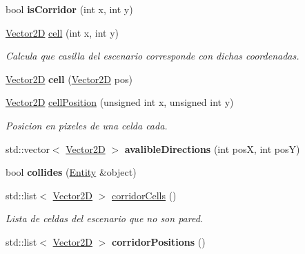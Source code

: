 \begin{DoxyCompactItemize}
\item 
\hypertarget{class_scenario_ac55d32b9280231f5f3c608b88fb79222}{bool {\bfseries is\-Corridor} (int x, int y)}\label{class_scenario_ac55d32b9280231f5f3c608b88fb79222}

\item 
\hyperlink{class_vector2_d}{Vector2\-D} \hyperlink{class_scenario_ad48f84e44fef3ae985cdd3245acf065d}{cell} (int x, int y)
\begin{DoxyCompactList}\small\item\em Calcula que casilla del escenario corresponde con dichas coordenadas. \end{DoxyCompactList}\item 
\hypertarget{class_scenario_a7164ece5fdfe79405863ebed3590fb0d}{\hyperlink{class_vector2_d}{Vector2\-D} {\bfseries cell} (\hyperlink{class_vector2_d}{Vector2\-D} pos)}\label{class_scenario_a7164ece5fdfe79405863ebed3590fb0d}

\item 
\hypertarget{class_scenario_a3a0f6033d2652feb47b69d9838af31b0}{\hyperlink{class_vector2_d}{Vector2\-D} \hyperlink{class_scenario_a3a0f6033d2652feb47b69d9838af31b0}{cell\-Position} (unsigned int x, unsigned int y)}\label{class_scenario_a3a0f6033d2652feb47b69d9838af31b0}

\begin{DoxyCompactList}\small\item\em Posicion en pixeles de una celda cada. \end{DoxyCompactList}\item 
\hypertarget{class_scenario_a501950a0beb5aaeb0e31704818097ae4}{std\-::vector$<$ \hyperlink{class_vector2_d}{Vector2\-D} $>$ {\bfseries avalible\-Directions} (int pos\-X, int pos\-Y)}\label{class_scenario_a501950a0beb5aaeb0e31704818097ae4}

\item 
\hypertarget{class_scenario_a4cad7d000c20baab4301e2561c82f514}{bool {\bfseries collides} (\hyperlink{class_entity}{Entity} \&object)}\label{class_scenario_a4cad7d000c20baab4301e2561c82f514}

\item 
\hypertarget{class_scenario_a0789f28647f405ff79bde8a2cb03931c}{std\-::list$<$ \hyperlink{class_vector2_d}{Vector2\-D} $>$ \hyperlink{class_scenario_a0789f28647f405ff79bde8a2cb03931c}{corridor\-Cells} ()}\label{class_scenario_a0789f28647f405ff79bde8a2cb03931c}

\begin{DoxyCompactList}\small\item\em Lista de celdas del escenario que no son pared. \end{DoxyCompactList}\item 
\hypertarget{class_scenario_af50bc8b0ac052db72a77a1d265078b6b}{std\-::list$<$ \hyperlink{class_vector2_d}{Vector2\-D} $>$ {\bfseries corridor\-Positions} ()}\label{class_scenario_af50bc8b0ac052db72a77a1d265078b6b}


\end{DoxyCompactItemize}
